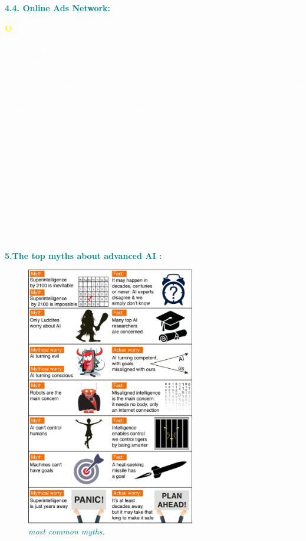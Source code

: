 \documentclass[12pt]{article}
\begin{document}
\begin{large}
\textbf{\textcolor{teal}{4.4. Online Ads Network:}}\\
\end{large}

\textcolor{white}{\textbf{\textcolor{yellow}{\huge O}}ne of the biggest customers of Artificial Intelligence is the online advertising industry, which uses AI to track user statistics and serve our ads based on those statistics. Without AI, the online advertising industry would be failing because it would show random ads that consumers had no connection to their preferences. AI has been so successful in determining our interests and delivering advertising that the global digital ad industry has exceeded the US  250 billion US dolar, with the industry expected to exceed the 300 billion mark in 2019. So when you go online and see ads or a product recommendation, know that AI is affecting your life.}\\\\\\\\\\\\\\\\\\\\\\



\begin{large}
\textbf{\textcolor{teal}{5.The top myths about advanced AI :}}\\
\end{large}
\begin{figure}
\centering
\includegraphics[width=2.9in]{myths-1}

\caption{\textit{\textcolor{teal}{most common myths.}}}
\end{figure}
\end{document}
